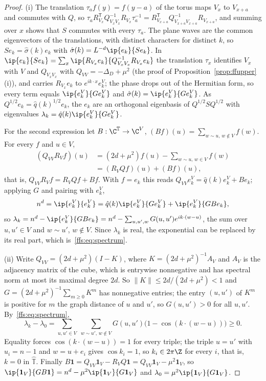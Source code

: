 \begin{proof}
(i) The translation $\tau_af(y)=f(y-a)$ of the torus maps $V_x$ to $V_{x+a}$
and commutes with $Q$, so $\tau_aR_{V_x}^{\mathsf T}Q_{V_xV_x}^{-1}R_{V_x}\tau_a
^{-1}=R_{V_{x+a}}^{\mathsf T}Q_{V_{x+a}V_{x+a}}^{-1}R_{V_{x+a}}$, and summing
over $x$ shows that $S$ commutes with every $\tau_a$. The plane waves are the
common eigenvectors of the translations, with distinct characters for distinct
$k$, so $Se_k=\hat\sigma(k)e_k$ with $\hat\sigma(k)=L^{-d}\ip{e_k}{Se_k}$. In
$\ip{e_k}{Se_k}=\sum_x\ip{R_{V_x}e_k}{Q_{V_xV_x}^{-1}R_{V_x}e_k}$ the
translation $\tau_x$ identifies $V_x$ with $V$ and $Q_{V_xV_x}$ with $Q_{VV}=
-\Delta_D+\mu^2$ (the proof of Proposition~\ref{prop:ffupper}(i)), and carries
$R_{V_x}e_k$ to $e^{ik\cdot x}e_k^V$; the phase drops out of the Hermitian
form, so every term equals $\ip{e_k^V}{Ge_k^V}$ and $\hat\sigma(k)=\ip{e_k^V}
{Ge_k^V}$. As $Q^{1/2}e_k=\hat q(k)^{1/2}e_k$, the $e_k$ are an orthogonal
eigenbasis of $Q^{1/2}SQ^{1/2}$ with eigenvalues $\lambda_k=\hat q(k)\ip{e_k^V}
{Ge_k^V}$.

For the second expression let $B:\C^{\mathbb T}\to\C^V$, $(Bf)(u)=\sum_{w\sim
u,\,w\notin V}f(w)$. For every $f$ and $u\in V$,
\begin{align*}
(Q_{VV}R_Vf)(u)&=(2d+\mu^2)f(u)-\sum_{w\sim u,\,w\in V}f(w)\\
&=(R_VQf)(u)+(Bf)(u),
\end{align*}
that is, $Q_{VV}R_Vf=R_VQf+Bf$. With $f=e_k$ this reads $Q_{VV}e_k^V=\hat
q(k)e_k^V+Be_k$; applying $G$ and pairing with $e_k^V$,
\[
n^d=\ip{e_k^V}{e_k^V}=\hat q(k)\ip{e_k^V}{Ge_k^V}+\ip{e_k^V}{GBe_k},
\]
so $\lambda_k=n^d-\ip{e_k^V}{GBe_k}=n^d-\sum_{u,u',w}G(u,u')e^{ik\cdot(w-u)}$,
the sum over $u,u'\in V$ and $w\sim u'$, $w\notin V$. Since $\lambda_k$ is
real, the exponential can be replaced by its real part, which
is~\eqref{ffs:eq:spectrum}.

(ii) Write $Q_{VV}=(2d+\mu^2)(I-K)$, where $K=(2d+\mu^2)^{-1}A_V$ and $A_V$ is
the adjacency matrix of the cube, which is entrywise nonnegative and has
spectral norm at most its maximal degree $2d$. So $\lVert K\rVert\le2d/(2d+\mu^2)
<1$ and $G=(2d+\mu^2)^{-1}\sum_{m\ge0}K^m$ has nonnegative entries; the entry
$(u,u')$ of $K^m$ is positive for $m$ the graph distance of $u$ and $u'$, so
$G(u,u')>0$ for all $u,u'$. By~\eqref{ffs:eq:spectrum},
\[
\lambda_k-\lambda_0=\sum_{u,u'\in V}\;\sum_{w\sim u',\,w\notin V}G(u,u')
\bigl(1-\cos(k\cdot(w-u))\bigr)\ge0 .
\]
Equality forces $\cos(k\cdot(w-u))=1$ for every triple; the triple $u=u'$ with
$u_i=n-1$ and $w=u+e_i$ gives $\cos k_i=1$, so $k_i\in2\pi\Z$ for every $i$,
that is, $k=0$ in $\widehat{\mathbb T}$. Finally $B\mathbf 1=Q_{VV}\mathbf 1_V-
R_VQ\mathbf 1=Q_{VV}\mathbf 1_V-\mu^2\mathbf 1_V$, so $\ip{\mathbf 1_V}{GB
\mathbf 1}=n^d-\mu^2\ip{\mathbf 1_V}{G\mathbf 1_V}$ and $\lambda_0=\mu^2\ip{
\mathbf 1_V}{G\mathbf 1_V}$.


\end{proof}
